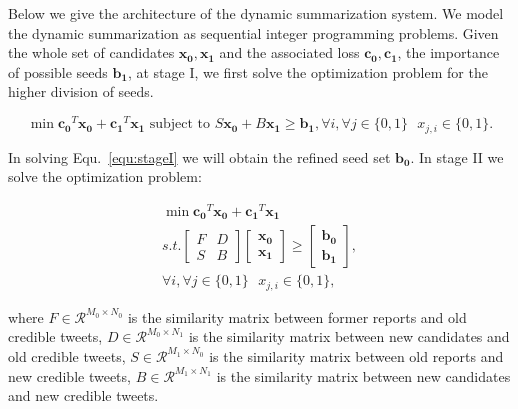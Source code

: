 \documentclass[envcountsame]{llncs}
\begin{document}
Below we give the architecture of the dynamic summarization system. We model the dynamic summarization as sequential integer programming problems.  Given the whole set of candidates $\mathbf{x_0,x_1}$ and the associated loss $\mathbf{c_0,c_1}$, the importance of possible seeds $\mathbf{b_1}$, at stage I, we first solve the optimization problem for the higher division of seeds.

\vspace{-0.6cm}
\begin{equation}\label{equ:stageI}
\min \mathbf{c_0}^T \mathbf{x_0} + \mathbf{c_1}^T \mathbf{x_1} \textrm{ subject to } S \mathbf{x_0} + B\mathbf{x_1} \geq \mathbf{b_1}, \forall i, \forall j\in \{0,1\}\textrm{ } x_{j,i}\in \{0,1\}.
\end{equation}
\vspace{-0.6cm}

In solving Equ.~\ref{equ:stageI} we will obtain the refined seed set $\mathbf{b_0}$. In stage II we solve the optimization problem:

\vspace{-0.6cm}
\begin{eqnarray}
\min \mathbf{c_0}^T \mathbf{x_0}+\mathbf{c_1}^T\mathbf{x_1}\\\nonumber
s.t. \begin{bmatrix}
F & D \\
S & B
\end{bmatrix}\begin{bmatrix}
 \mathbf{x_0}\\
\mathbf{x_1}
\end{bmatrix}\geq \begin{bmatrix}
\mathbf{b_0}\\
\mathbf{b_1}
\end{bmatrix},\\\nonumber
 \forall i, \forall j\in \{0,1\}\textrm{ } x_{j,i}\in \{0,1\},
\end{eqnarray}
\vspace{-0.6cm}

where $F\in \mathcal{R}^{M_0\times N_0}$ is the similarity matrix between former reports and old credible tweets, $D\in \mathcal{R}^{M_0\times N_1}$ is the similarity matrix between new candidates and old credible tweets, $S\in \mathcal{R}^{M_1\times N_0}$ is the similarity matrix between old reports and new credible tweets, $B\in \mathcal{R}^{M_1 \times N_1}$ is the similarity matrix between new candidates and new credible tweets.

\end{document}
